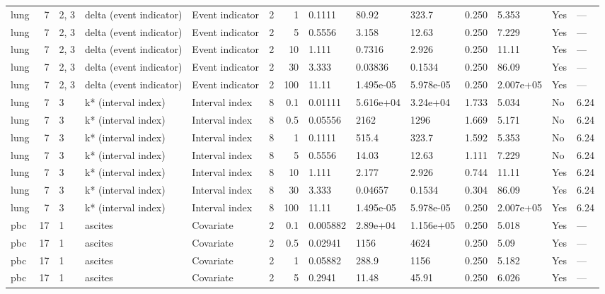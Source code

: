 \begin{tabular}{lrlllrrlllllll}
  lung & 7 & 2, 3 & delta (event indicator) & Event indicator & 2 &     1 & 0.1111 & 80.92 & 323.7 & 0.250 & 5.353 & Yes & --- \\ 
  lung & 7 & 2, 3 & delta (event indicator) & Event indicator & 2 &     5 & 0.5556 & 3.158 & 12.63 & 0.250 & 7.229 & Yes & --- \\ 
  lung & 7 & 2, 3 & delta (event indicator) & Event indicator & 2 &    10 & 1.111 & 0.7316 & 2.926 & 0.250 & 11.11 & Yes & --- \\ 
  lung & 7 & 2, 3 & delta (event indicator) & Event indicator & 2 &    30 & 3.333 & 0.03836 & 0.1534 & 0.250 & 86.09 & Yes & --- \\ 
  lung & 7 & 2, 3 & delta (event indicator) & Event indicator & 2 &   100 & 11.11 & 1.495e-05 & 5.978e-05 & 0.250 & 2.007e+05 & Yes & --- \\ 
  lung & 7 & 3 & k* (interval index) & Interval index & 8 &   0.1 & 0.01111 & 5.616e+04 & 3.24e+04 & 1.733 & 5.034 & No & 6.24 \\ 
  lung & 7 & 3 & k* (interval index) & Interval index & 8 &   0.5 & 0.05556 & 2162 & 1296 & 1.669 & 5.171 & No & 6.24 \\ 
  lung & 7 & 3 & k* (interval index) & Interval index & 8 &     1 & 0.1111 & 515.4 & 323.7 & 1.592 & 5.353 & No & 6.24 \\ 
  lung & 7 & 3 & k* (interval index) & Interval index & 8 &     5 & 0.5556 & 14.03 & 12.63 & 1.111 & 7.229 & No & 6.24 \\ 
  lung & 7 & 3 & k* (interval index) & Interval index & 8 &    10 & 1.111 & 2.177 & 2.926 & 0.744 & 11.11 & Yes & 6.24 \\ 
  lung & 7 & 3 & k* (interval index) & Interval index & 8 &    30 & 3.333 & 0.04657 & 0.1534 & 0.304 & 86.09 & Yes & 6.24 \\ 
  lung & 7 & 3 & k* (interval index) & Interval index & 8 &   100 & 11.11 & 1.495e-05 & 5.978e-05 & 0.250 & 2.007e+05 & Yes & 6.24 \\ 
  pbc & 17 & 1 & ascites & Covariate & 2 &   0.1 & 0.005882 & 2.89e+04 & 1.156e+05 & 0.250 & 5.018 & Yes & --- \\ 
  pbc & 17 & 1 & ascites & Covariate & 2 &   0.5 & 0.02941 & 1156 & 4624 & 0.250 & 5.09 & Yes & --- \\ 
  pbc & 17 & 1 & ascites & Covariate & 2 &     1 & 0.05882 & 288.9 & 1156 & 0.250 & 5.182 & Yes & --- \\ 
  pbc & 17 & 1 & ascites & Covariate & 2 &     5 & 0.2941 & 11.48 & 45.91 & 0.250 & 6.026 & Yes & --- \\ 

\end{tabular}
